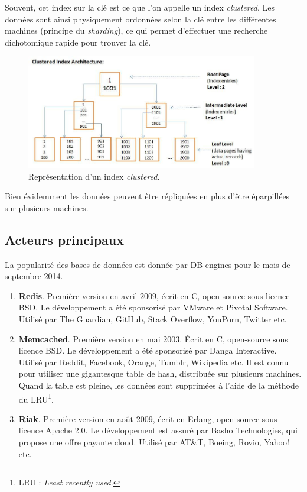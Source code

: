 	Souvent, cet index sur la clé est ce que l'on appelle un index \textit{clustered}. Les données sont ainsi physiquement ordonnées selon la clé entre les différentes machines (principe du \textit{sharding}), ce qui permet d'effectuer une recherche dichotomique rapide pour trouver la clé.

	\begin{figure}[H]
		\centering
		\includegraphics[width=0.9\textwidth]{images/clusteredIndex.jpg}
		\caption{Représentation d'un index \textit{clustered}.}
	\end{figure}

	Bien évidemment les données peuvent être répliquées en plus d'être éparpillées sur plusieurs machines.

\subsection{Acteurs principaux}
	La popularité des bases de données est donnée par DB-engines\cite{db_engines_key_value} pour le mois de septembre 2014.

	\begin{enumerate}
		\item \textbf{Redis}. Première version en avril 2009, écrit en C, open-source sous licence BSD. Le développement a été sponsorisé par VMware et Pivotal Software. Utilisé par The Guardian, GitHub, Stack Overflow, YouPorn, Twitter etc.\cite{Wikipedia_redis}
		\item \textbf{Memcached}. Première version en mai 2003. Écrit en C, open-source sous licence BSD. Le développement a été sponsorisé par Danga Interactive. Utilisé par Reddit, Facebook, Orange, Tumblr, Wikipedia etc. Il est connu pour utiliser une gigantesque table de hash, distribuée sur plusieurs machines. Quand la table est pleine, les données sont supprimées à l'aide de la méthode du LRU\footnote{LRU : \textit{Least recently used}.}.\cite{Wikipedia_memcached}
		\item \textbf{Riak}. Première version en août 2009, écrit en Erlang, open-source sous licence Apache 2.0. Le développement est assuré par Basho Technologies, qui propose une offre payante cloud. Utilisé par AT\&T, Boeing, Rovio, Yahoo! etc.\cite{Wikipedia_riak}
	\end{enumerate}

